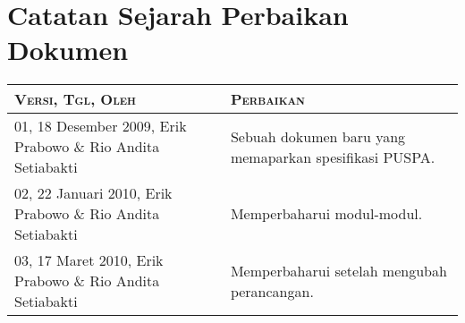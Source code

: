 \part*{\textcolor{sectioncolor}{\textsf{\large Catatan Sejarah Perbaikan Dokumen}}}

\begin{tabular}{|p{4cm}|p{11cm}|}
\hline
{\scshape Versi, Tgl, Oleh} & {\scshape Perbaikan}\\
\hline
01, 18 Desember 2009, Erik Prabowo \& Rio Andita Setiabakti & Sebuah dokumen baru yang memaparkan spesifikasi PUSPA.\\
\hline
02, 22 Januari 2010, Erik Prabowo \& Rio Andita Setiabakti & Memperbaharui modul-modul.\\
\hline
03, 17 Maret 2010, Erik Prabowo \& Rio Andita Setiabakti & Memperbaharui setelah mengubah perancangan.\\
\hline
\end{tabular}

